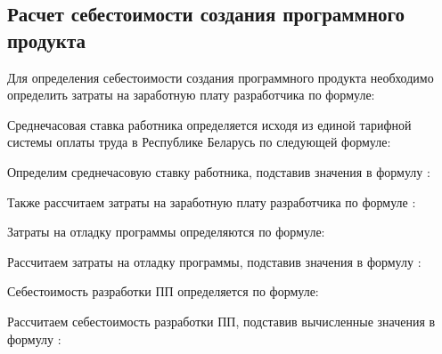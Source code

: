 \subsection{Расчет себестоимости создания программного продукта}
\label{sec:economics:pppurecost}

Для определения себестоимости создания программного продукта необходимо определить затраты на заработную плату разработчика по формуле:
\developerHourPriceEquation

Среднечасовая ставка работника определяется исходя из единой тарифной системы оплаты труда в Республике Беларусь по следующей формуле:
\developerHourRateEquation

Определим среднечасовую ставку работника, подставив значения в формулу :
\developerHourRateFormulaApplied

Также рассчитаем затраты на заработную плату разработчика по формуле :
\developerHourPriceFormulaApplied

Затраты на отладку программы определяются по формуле:
\softwareDebugCostEquation

Рассчитаем затраты на отладку программы, подставив значения в формулу :
\softwareDebugCostFormulaApplied

Себестоимость разработки ПП определяется по формуле:
\ppCostEquation

Рассчитаем себестоимость разработки ПП, подставив вычисленные значения в формулу :
\ppCostFormulaApplied